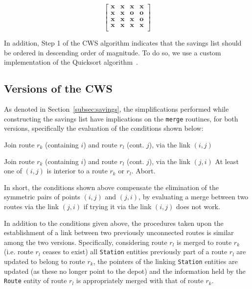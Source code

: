 \begin{equation}
\begin{bmatrix} \textbf{x} & \textbf{x} & \textbf{x} & \textbf{x} \\ 
                \textbf{x} & \textbf{x} & \textbf{o} & \textbf{o} \\ 
                \textbf{x} & \textbf{x} & \textbf{x} & \textbf{o} \\ 
                \textbf{x} & \textbf{x} & \textbf{x} & \textbf{x} \\ \end{bmatrix}
    \label{eq:savings}
\end{equation}\vertbreak

In addition, Step 1 of the CWS algorithm indicates that the savings list should 
be ordered in descending order of magnitude. To do so, we use a custom 
implementation of the Quicksort 
algorithm~\cite{Hoare:1961:AP:366622.366642}.

\subsection{Versions of the CWS}
\label{subsec:cws-p}

As denoted in Section~\ref{subsec:savings}, the simplifications performed while 
constructing the savings list have implications on the \verb?merge? routines, 
for both versions, specifically the evaluation of the conditions shown 
below:\vertbreak

\begin{algorithmic}[1]

    \State Join route $r_k$ (containing $i$) and route $r_l$ (cont. $j$), via 
    \Statex[2] the link $(i,j)$
    

    \State Join route $r_k$ (containing $i$) and route $r_l$ (cont. $j$), via 
    \Statex[2] the link $(j,i)$
\Else 
    \State At least one of $(i,j)$ is interior to a route $r_k$ or $r_l$. 
    \Statex[2] Abort.
\EndIf
\end{algorithmic}\vertbreak

In short, the conditions shown above compensate the elimination of the symmetric 
pairs of points $(i,j)$ and $(j,i)$, by evaluating a merge between two routes 
via the link $(j,i)$ if trying it via the link $(i,j)$ does not work.\vertbreak

In addition to the conditions given above, the procedures taken upon the 
establishment of a link between two previously unconnected routes is similar 
among the two versions. Specifically, considering route $r_l$ is merged to route 
$r_k$ (i.e. route $r_l$ ceases to exist) all \verb?Station? entities previously 
part of a route $r_l$ are updated to belong to route $r_k$, the pointers of the 
linking \verb?Station? entities are updated (as these no longer point to the 
depot) and the information held by the \verb?Route? entity of route $r_l$ is 
appropriately merged with that of route $r_k$.\vertbreak

